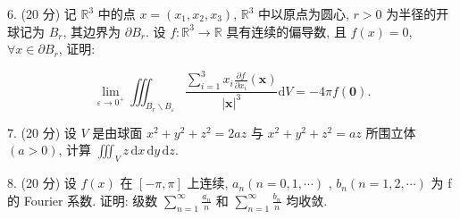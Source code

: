 \documentclass{examcollection}
\renewcommand{\displayformula}[1]{\[#1\]}
\begin{document}
{\begin{minipage}{\textwidth}
6. (20 分) 记 $\mathbb{R}^3$ 中的点 $x = (x_1, x_2, x_3)$, $\mathbb{R}^3$ 中以原点为圆心, $r > 0$ 为半径的开球记为 $B_r$, 其边界为 $\partial B_r$. 设 $f: \mathbb{R}^3 \to \mathbb{R}$ 具有连续的偏导数, 且 $f(x) = 0$, $\forall x \in \partial B_r$, 证明:\par
\displayformula{\lim _ {\varepsilon \rightarrow 0 ^ {+}} \iiint_ {B _ {r} \backslash B _ {\varepsilon}} \frac {\sum_ {i = 1} ^ {3} x _ {i} \frac {\partial f}{\partial x _ {i}} (\boldsymbol {x})}{| \boldsymbol {x} | ^ {3}} \mathrm{d} V = - 4 \pi f (\boldsymbol {0}).}\par
7. (20 分) 设 $V$ 是由球面 $x^{2} + y^{2} + z^{2} = 2az$ 与 $x^{2} + y^{2} + z^{2} = az$ 所围立体 $(a > 0)$, 计算 $\iiint_{V} z \, \mathrm{d}x \, \mathrm{d}y \, \mathrm{d}z$.\par
8. (20 分) 设  $f(x)$  在  $[-\pi , \pi ]$  上连续,  $a_{n} (n = 0, 1, \cdots)$ ,  $b_{n} (n = 1, 2, \cdots)$  为 f 的 Fourier 系数. 证明: 级数  $\sum_{n=1}^{\infty} \frac{a_{n}}{n}$  和  $\sum_{n=1}^{\infty} \frac{b_{n}}{n}$  均收敛.\par
\end{minipage}}
\ifdim\dimexpr\ht\proofbox+\dp\proofbox\relax>\textheight
\noindent\resizebox{!}{\textheight}{\usebox{\proofbox}}\else\noindent\usebox{\proofbox}\fi\clearpage
\end{document}
